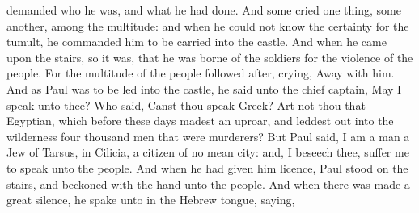 {demanded
who he
was,
and
what he
had
done.
And
some
cried one
thing, some
another,
among the
multitude:
and when he
could
not
know the
certainty
for the
tumult, he
commanded
him to be
carried
into the
castle.
And
when
he
came
upon the
stairs, so it
was, that he was
borne
of the
soldiers
for the
violence of the
people.
For the
multitude of the
people followed
after,
crying, Away
with
him.
And as
Paul
was to be
led
into the
castle, he
said unto the chief
captain,
May
I
speak
unto
thee?
Who
said, Canst thou
speak
Greek?
Art
not
thou
that
Egyptian,
which
before
these
days madest an
uproar,
and leddest
out
into the
wilderness four
thousand
men that were
murderers?
But
Paul
said,
I
am a
man
{} a
Jew of
Tarsus,
{} in
Cilicia, a
citizen
of
no
mean
city:
and, I
beseech
thee,
suffer
me to
speak
unto the
people.
And when he had
given
him
licence,
Paul
stood
on the
stairs, and
beckoned with the
hand unto the
people.
And when there was
made a
great
silence, he spake
unto
{} in the
Hebrew
tongue,
saying,

}
